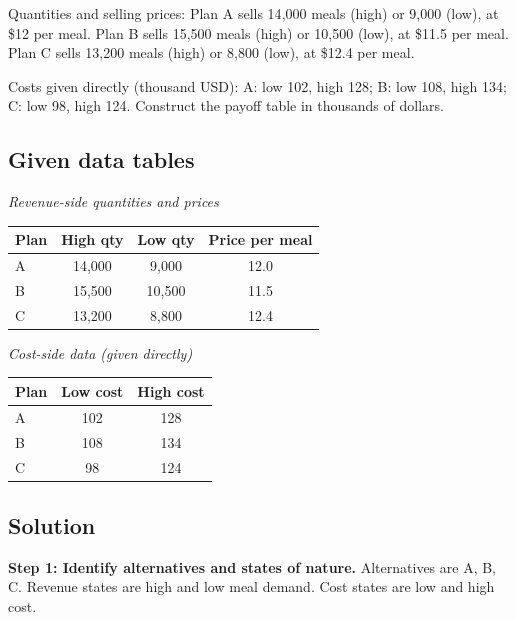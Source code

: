 \begin{ExamProblems}
		Quantities and selling prices:
		Plan A sells 14{,}000 meals (high) or 9{,}000 (low), at \$12 per meal.
		Plan B sells 15{,}500 meals (high) or 10{,}500 (low), at \$11.5 per meal.
		Plan C sells 13{,}200 meals (high) or 8{,}800 (low), at \$12.4 per meal.
		
		Costs given directly (thousand USD):
		A: low 102, high 128; B: low 108, high 134; C: low 98, high 124.
		Construct the payoff table in thousands of dollars.
		
		\subsection*{Given data tables}
		\begin{center}
			\begin{minipage}[t]{0.48\linewidth}
				\textit{Revenue-side quantities and prices}
				\begin{center}
					\begin{tabular}{l c c c}
						\toprule
						Plan & High qty & Low qty & Price per meal \\
						\midrule
						A & 14{,}000 & 9{,}000 & 12.0 \\
						B & 15{,}500 & 10{,}500 & 11.5 \\
						C & 13{,}200 & 8{,}800 & 12.4 \\
						\bottomrule
					\end{tabular}
				\end{center}
			\end{minipage}
			\hfill
			\begin{minipage}[t]{0.48\linewidth}
				\textit{Cost-side data (given directly)}
				\begin{center}
					\begin{tabular}{l c c}
						\toprule
						Plan & Low cost & High cost \\
						\midrule
						A & 102 & 128 \\
						B & 108 & 134 \\
						C & 98 & 124 \\
						\bottomrule
					\end{tabular}
				\end{center}
			\end{minipage}
		\end{center}
		
		\subsection*{Solution}
		\textbf{Step 1: Identify alternatives and states of nature.} Alternatives are A, B, C. Revenue states are high and low meal demand. Cost states are low and high cost.
		

\end{ExamProblems}
